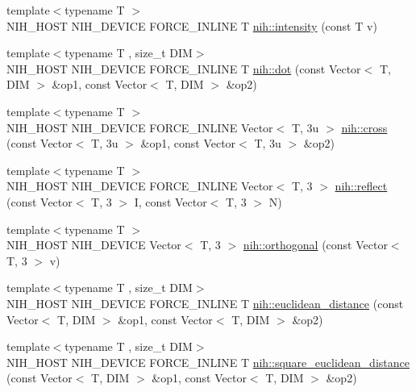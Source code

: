 \begin{DoxyCompactItemize}
\item 
{\footnotesize template$<$typename T $>$ }\\\-N\-I\-H\-\_\-\-H\-O\-S\-T \-N\-I\-H\-\_\-\-D\-E\-V\-I\-C\-E \-F\-O\-R\-C\-E\-\_\-\-I\-N\-L\-I\-N\-E \-T \hyperlink{group__linalg_ga5aba2566a39c58297e8f97bcf771519f}{nih\-::intensity} (const \-T v)
\item 
{\footnotesize template$<$typename T , size\-\_\-t \-D\-I\-M$>$ }\\\-N\-I\-H\-\_\-\-H\-O\-S\-T \-N\-I\-H\-\_\-\-D\-E\-V\-I\-C\-E \-F\-O\-R\-C\-E\-\_\-\-I\-N\-L\-I\-N\-E \-T \hyperlink{group__linalg_ga299bb7e770db20680a383864db4bd843}{nih\-::dot} (const \-Vector$<$ \-T, \-D\-I\-M $>$ \&op1, const \-Vector$<$ \-T, \-D\-I\-M $>$ \&op2)
\item 
{\footnotesize template$<$typename T $>$ }\\\-N\-I\-H\-\_\-\-H\-O\-S\-T \-N\-I\-H\-\_\-\-D\-E\-V\-I\-C\-E \*
\-F\-O\-R\-C\-E\-\_\-\-I\-N\-L\-I\-N\-E \-Vector$<$ \-T, 3u $>$ \hyperlink{group__linalg_ga14de1c4465c863797732d372f933a932}{nih\-::cross} (const \-Vector$<$ \-T, 3u $>$ \&op1, const Vector$<$ T, 3u $>$ \&op2)
\item 
{\footnotesize template$<$typename T $>$ }\\\-N\-I\-H\-\_\-\-H\-O\-S\-T \-N\-I\-H\-\_\-\-D\-E\-V\-I\-C\-E \*
\-F\-O\-R\-C\-E\-\_\-\-I\-N\-L\-I\-N\-E \-Vector$<$ \-T, 3 $>$ \hyperlink{group__linalg_ga45b100c1ab0f691ea58662e70c0801c3}{nih\-::reflect} (const \-Vector$<$ \-T, 3 $>$ \-I, const \-Vector$<$ \-T, 3 $>$ \-N)
\item 
{\footnotesize template$<$typename T $>$ }\\\-N\-I\-H\-\_\-\-H\-O\-S\-T \-N\-I\-H\-\_\-\-D\-E\-V\-I\-C\-E \-Vector$<$ \-T, 3 $>$ \hyperlink{group__linalg_gac2324a31b7a178eaea07e98f0b13f292}{nih\-::orthogonal} (const \-Vector$<$ \-T, 3 $>$ v)
\item 
{\footnotesize template$<$typename T , size\-\_\-t \-D\-I\-M$>$ }\\\-N\-I\-H\-\_\-\-H\-O\-S\-T \-N\-I\-H\-\_\-\-D\-E\-V\-I\-C\-E \-F\-O\-R\-C\-E\-\_\-\-I\-N\-L\-I\-N\-E \-T \hyperlink{group__linalg_gad840e1ac601434335deb2ac40bdf71dc}{nih\-::euclidean\-\_\-distance} (const \-Vector$<$ \-T, \-D\-I\-M $>$ \&op1, const \-Vector$<$ \-T, \-D\-I\-M $>$ \&op2)
\item 
{\footnotesize template$<$typename T , size\-\_\-t \-D\-I\-M$>$ }\\\-N\-I\-H\-\_\-\-H\-O\-S\-T \-N\-I\-H\-\_\-\-D\-E\-V\-I\-C\-E \-F\-O\-R\-C\-E\-\_\-\-I\-N\-L\-I\-N\-E \-T \hyperlink{group__linalg_ga21d1cd79e48416f289f7b0e55f3b32dc}{nih\-::square\-\_\-euclidean\-\_\-distance} (const \-Vector$<$ \-T, \-D\-I\-M $>$ \&op1, const \-Vector$<$ \-T, \-D\-I\-M $>$ \&op2)

\end{DoxyCompactItemize}
